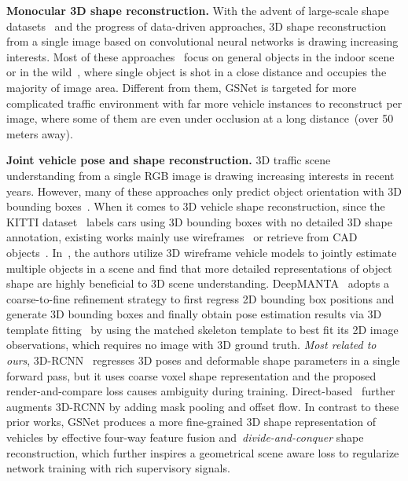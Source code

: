 \documentclass[runningheads]{llncs}
\begin{document}
\smallskip\noindent\textbf{Monocular 3D shape reconstruction.}
With the advent of large-scale shape datasets~\cite{chang2015shapenet} and the progress of data-driven approaches, 3D shape reconstruction from a single image based on convolutional neural networks is drawing increasing interests. Most of these approaches~\cite{richter2018matryoshka,wu20153d,zhu2017rethinking,yan2016perspective,sinha2017surfnet,riegler2017octnet,kong2017using,lin2019photometric} focus on general objects in the indoor scene or in the wild~\cite{kar2015category}, where single object is shot in a close distance and occupies the majority of image area. Different from them, GSNet is targeted for more complicated traffic environment with far more vehicle instances to reconstruct per image, where some of them are even under occlusion at a long distance~(over 50 meters away). 

\smallskip\noindent\textbf{Joint vehicle pose and shape reconstruction.}
3D traffic scene understanding from a single RGB image is drawing increasing interests in recent years. 
However, many of these approaches only predict object orientation with 3D bounding boxes~\cite{chen2017multi,liang2018deep,yang2018pixor,liu2019deep,brazil2019m3d,simonelli2019disentangling,xu2018multi}.
When it comes to 3D vehicle shape reconstruction, since the KITTI dataset~\cite{geiger2012we} labels cars using 3D bounding boxes with no detailed 3D shape annotation, existing works mainly use wireframes~\cite{zia2013detailed,li2017deep,wu2016single,Krishna_ICRA2017} or retrieve from CAD objects~\cite{chabot2017deep,song2019apollocar3d,mottaghi2015coarse,xiang2015data}.
In~\cite{zeeshan2014cars}, the authors utilize 3D wireframe vehicle models to jointly estimate multiple objects in a scene and find that more detailed representations of object shape are highly beneficial to 3D scene understanding.
DeepMANTA~\cite{chabot2017deep} adopts a coarse-to-fine refinement strategy to first regress 2D bounding box positions and generate 3D bounding boxes and finally obtain pose estimation results via 3D template fitting~\cite{lepetit2009epnp} by using the matched skeleton template to best fit its 2D image observations, which requires no image with 3D ground truth.
\textit{Most related to ours}, 3D-RCNN~\cite{kundu20183d} regresses 3D poses and deformable shape parameters in a single forward pass, but it uses coarse voxel shape representation and the proposed render-and-compare loss causes ambiguity during training. Direct-based~\cite{song2019apollocar3d} further augments 3D-RCNN by adding mask pooling and offset flow.
In contrast to these prior works, GSNet produces a more fine-grained 3D shape representation of vehicles by effective four-way feature fusion and~\textit{divide-and-conquer} shape reconstruction, which further inspires a geometrical scene aware loss to regularize network training with rich supervisory signals. 
\end{document}
